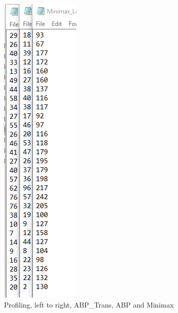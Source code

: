 \documentclass{article}
\begin{document}
\begin{figure}[H]
\centering
\includegraphics[width=\linewidth,height=\textheight,keepaspectratio]{Profiling}
\caption{Profiling, left to right, ABP\_Trans, ABP and Minimax}
\end{figure}
\end{document}
